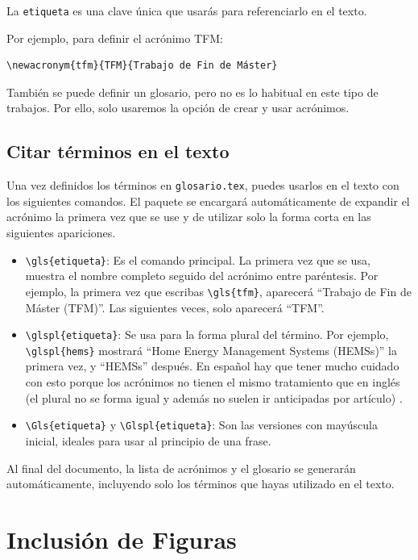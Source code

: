 \documentclass[11pt,a4paper]{book}
\begin{document}
La \texttt{etiqueta} es una clave única que usarás para referenciarlo en el texto.

Por ejemplo, para definir el acrónimo TFM:
\begin{verbatim}
\newacronym{tfm}{TFM}{Trabajo de Fin de Máster}
\end{verbatim}

También se puede definir un glosario, pero no es lo habitual en este tipo de trabajos. Por ello, solo usaremos la opción de crear y usar acrónimos.

\subsection{Citar términos en el texto}

Una vez definidos los términos en \texttt{glosario.tex}, puedes usarlos en el texto con los siguientes comandos. El paquete se encargará automáticamente de expandir el acrónimo la primera vez que se use y de utilizar solo la forma corta en las siguientes apariciones.

\begin{itemize}
    \item \verb|\gls{etiqueta}|: Es el comando principal. La primera vez que se usa, muestra el nombre completo seguido del acrónimo entre paréntesis. Por ejemplo, la primera vez que escribas \verb|\gls{tfm}|, aparecerá ``Trabajo de Fin de Máster (TFM)''. Las siguientes veces, solo aparecerá ``TFM''.

    \item \verb|\glspl{etiqueta}|: Se usa para la forma plural del término. Por ejemplo, \verb|\glspl{hems}| mostrará ``Home Energy Management Systems (HEMSs)'' la primera vez, y ``HEMSs'' después. En español hay que tener mucho cuidado con esto porque los acrónimos no tienen el mismo tratamiento que en inglés (el plural no se forma igual y además no suelen ir anticipadas por artículo) \cite{RAE-siglas}.

    \item \verb|\Gls{etiqueta}| y \verb|\Glspl{etiqueta}|: Son las versiones con mayúscula inicial, ideales para usar al principio de una frase.
\end{itemize}

Al final del documento, la lista de acrónimos y el glosario se generarán automáticamente, incluyendo solo los términos que hayas utilizado en el texto.


\section{Inclusión de Figuras}
\end{document}
